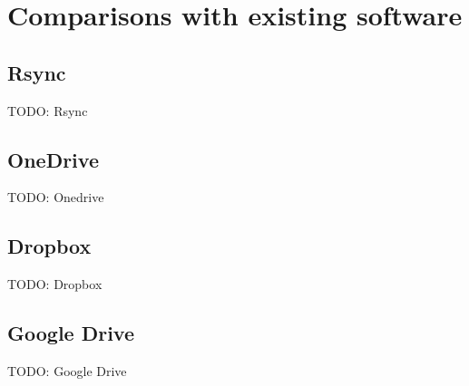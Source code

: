 
\chapter{Comparisons with existing software}



\section{Rsync}
    TODO: Rsync
\section{OneDrive}
    TODO: Onedrive
\section{Dropbox}
    TODO: Dropbox
\section{Google Drive}
    TODO: Google Drive
